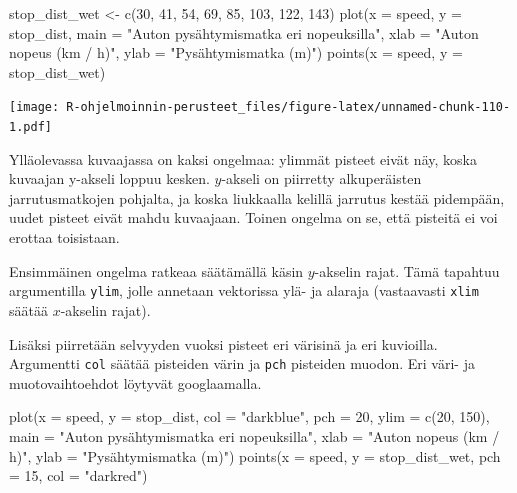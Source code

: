 \documentclass[
]{book}
\newenvironment{Shaded}{\begin{snugshade}}{\end{snugshade}}
\newcommand{\AttributeTok}[1]{\textcolor[rgb]{0.77,0.63,0.00}{#1}}
\newcommand{\DecValTok}[1]{\textcolor[rgb]{0.00,0.00,0.81}{#1}}
\newcommand{\FunctionTok}[1]{\textcolor[rgb]{0.00,0.00,0.00}{#1}}
\newcommand{\NormalTok}[1]{#1}
\newcommand{\OtherTok}[1]{\textcolor[rgb]{0.56,0.35,0.01}{#1}}
\newcommand{\StringTok}[1]{\textcolor[rgb]{0.31,0.60,0.02}{#1}}
\begin{document}
\begin{Shaded}
\begin{Highlighting}[]
\NormalTok{stop\_dist\_wet }\OtherTok{\textless{}{-}} \FunctionTok{c}\NormalTok{(}\DecValTok{30}\NormalTok{, }\DecValTok{41}\NormalTok{, }\DecValTok{54}\NormalTok{, }\DecValTok{69}\NormalTok{, }\DecValTok{85}\NormalTok{, }\DecValTok{103}\NormalTok{, }\DecValTok{122}\NormalTok{, }\DecValTok{143}\NormalTok{)}
\FunctionTok{plot}\NormalTok{(}\AttributeTok{x =}\NormalTok{ speed, }\AttributeTok{y =}\NormalTok{ stop\_dist,}
     \AttributeTok{main =} \StringTok{"Auton pysähtymismatka eri nopeuksilla"}\NormalTok{,}
     \AttributeTok{xlab =} \StringTok{"Auton nopeus (km / h)"}\NormalTok{, }\AttributeTok{ylab =} \StringTok{"Pysähtymismatka (m)"}\NormalTok{)}
\FunctionTok{points}\NormalTok{(}\AttributeTok{x =}\NormalTok{ speed, }\AttributeTok{y =}\NormalTok{ stop\_dist\_wet)}
\end{Highlighting}
\end{Shaded}

\texttt{[image: R-ohjelmoinnin-perusteet\_files/figure-latex/unnamed-chunk-110-1.pdf]}

Ylläolevassa kuvaajassa on kaksi ongelmaa: ylimmät pisteet eivät näy, koska kuvaajan y-akseli loppuu kesken. \(y\)-akseli on piirretty alkuperäisten jarrutusmatkojen pohjalta, ja koska liukkaalla kelillä jarrutus kestää pidempään, uudet pisteet eivät mahdu kuvaajaan. Toinen ongelma on se, että pisteitä ei voi erottaa toisistaan.

Ensimmäinen ongelma ratkeaa säätämällä käsin \(y\)-akselin rajat. Tämä tapahtuu argumentilla \texttt{ylim}, jolle annetaan vektorissa ylä- ja alaraja (vastaavasti \texttt{xlim} säätää \(x\)-akselin rajat).

Lisäksi piirretään selvyyden vuoksi pisteet eri värisinä ja eri kuvioilla. Argumentti \texttt{col} säätää pisteiden värin ja \texttt{pch} pisteiden muodon. Eri väri- ja muotovaihtoehdot löytyvät googlaamalla.

\begin{Shaded}
\begin{Highlighting}[]
\FunctionTok{plot}\NormalTok{(}\AttributeTok{x =}\NormalTok{ speed, }\AttributeTok{y =}\NormalTok{ stop\_dist,}
     \AttributeTok{col =} \StringTok{"darkblue"}\NormalTok{, }\AttributeTok{pch =} \DecValTok{20}\NormalTok{,}
     \AttributeTok{ylim =} \FunctionTok{c}\NormalTok{(}\DecValTok{20}\NormalTok{, }\DecValTok{150}\NormalTok{),}
     \AttributeTok{main =} \StringTok{"Auton pysähtymismatka eri nopeuksilla"}\NormalTok{,}
     \AttributeTok{xlab =} \StringTok{"Auton nopeus (km / h)"}\NormalTok{, }\AttributeTok{ylab =} \StringTok{"Pysähtymismatka (m)"}\NormalTok{)}
\FunctionTok{points}\NormalTok{(}\AttributeTok{x =}\NormalTok{ speed, }\AttributeTok{y =}\NormalTok{ stop\_dist\_wet, }\AttributeTok{pch =} \DecValTok{15}\NormalTok{, }\AttributeTok{col =} \StringTok{"darkred"}\NormalTok{)}
\end{Highlighting}
\end{Shaded}
\end{document}
